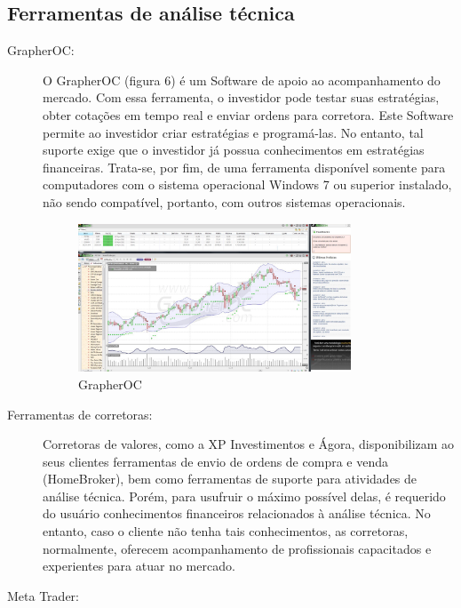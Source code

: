 \subsection{Ferramentas de análise técnica}

\begin{description}
\item[GrapherOC:]

O GrapherOC (figura 6) é um Software de apoio ao acompanhamento do mercado. Com essa ferramenta, o investidor pode testar suas estratégias, obter cotações em tempo real e enviar ordens para corretora. Este Software permite ao investidor criar estratégias e programá-las. No entanto, tal suporte exige que o investidor já possua conhecimentos em estratégias financeiras. Trata-se, por fim, de uma ferramenta disponível somente para computadores com o sistema operacional Windows 7 \textregistered   ou superior instalado, não sendo compatível, portanto, com outros sistemas operacionais.


\begin{figure}[h!]
\centering
\label{f03}
\includegraphics[width=0.8\textwidth]{figuras/f03}
\caption{GrapherOC}

\end{figure}
\FloatBarrier

\item[Ferramentas de corretoras:]

Corretoras de valores, como a XP Investimentos e Ágora, disponibilizam ao seus clientes ferramentas de envio de ordens de compra e venda (HomeBroker), bem como ferramentas de suporte para atividades de análise técnica. Porém, para usufruir o máximo possível delas, é requerido do usuário conhecimentos financeiros relacionados à análise técnica. No entanto, caso o cliente não tenha tais conhecimentos, as corretoras, normalmente, oferecem acompanhamento de profissionais capacitados e experientes para atuar no mercado.

\item[Meta Trader:]


\end{description}

